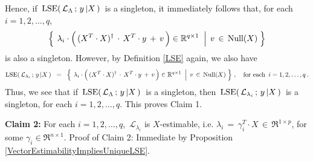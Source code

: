 Hence, if \,$\textnormal{LSE}\!\left(\,\mathcal{L}_{\Lambda} \,;\, y\,\vert X\,\right)$\, is a singleton,
it immediately follows that, for each \,$i = 1,2,\ldots,q$,
\begin{equation*}
\left\{\;
	\left.
	\lambda_{i} \cdot \left(\,(X^{T} \cdot X)^{\dagger} \overset{{\color{white}+}}{\cdot} X^{T} \cdot y \, + \, v \,\right)
	\in\Re^{q \times 1}
	\;\;\right\vert\;
	v \,\in\, \Null(X)
\;\right\}
\end{equation*}
is also a singleton.
However, by Definition \ref{LSE} again, we also have
\begin{equation*}
\lse\!\left(\,\mathcal{L}_{\lambda_{i}} \,;\, y\,\vert X\,\right)
\;\;=\;\;
	\left\{\;
		\left.
		\lambda_{i} \cdot \left(\,(X^{T} \cdot X)^{\dagger} \overset{{\color{white}+}}{\cdot} X^{T} \cdot y \, + \, v \,\right)
		\in\Re^{q \times 1}
		\;\;\right\vert\;
		v \,\in\, \Null(X)
	\;\right\}\,,
	\quad
	\textnormal{for each \,$i = 1,2,\ldots,q$}\,.
\end{equation*}
Thus, we see that
if \,$\textnormal{LSE}\!\left(\,\mathcal{L}_{\Lambda} \,;\, y\,\vert X\,\right)$\, is a singleton,
then \,$\textnormal{LSE}\!\left(\,\mathcal{L}_{\lambda_{i}} \,;\, y\,\vert X\,\right)$\, is a singleton,
for each $i = 1, 2, \ldots, q$.
This proves Claim 1.

\vskip 0.5cm
\noindent
\textbf{Claim 2:}\quad
For each $i = 1,2,\ldots,q$, \,$\mathcal{L}_{\lambda_{i}}$ is $X$-estimable, 
i.e. $\lambda_{i} \,=\, \gamma_{i}^{T} \cdot X \,\in\, \Re^{1 \times p}$, for some $\gamma_{i} \in \Re^{n \times 1}$.
\vskip 0.2cm
\noindent
Proof of Claim 2:\quad
Immediate by Proposition \ref{VectorEstimabilityImpliesUniqueLSE}.

